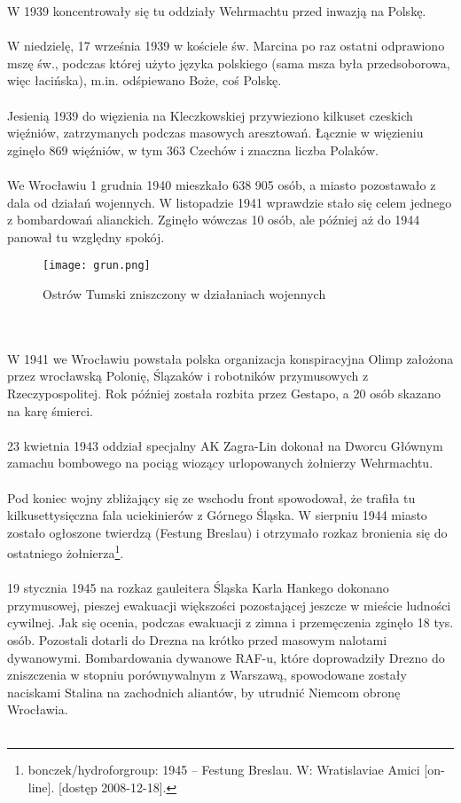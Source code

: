 \documentclass[12pt]{article}
\begin{document}
W 1939 koncentrowały się tu oddziały Wehrmachtu przed inwazją na Polskę.\\\\
W niedzielę, 17 września 1939 w kościele św. Marcina po raz ostatni odprawiono mszę św., podczas której użyto języka polskiego (sama msza była przedsoborowa, więc łacińska), m.in. odśpiewano Boże, coś Polskę.\\\\
Jesienią 1939 do więzienia na Kleczkowskiej przywieziono kilkuset czeskich więźniów, zatrzymanych podczas masowych aresztowań. Łącznie w więzieniu zginęło 869 więźniów, w tym 363 Czechów i znaczna liczba Polaków.\\\\
We Wrocławiu 1 grudnia 1940 mieszkało 638 905 osób, a miasto pozostawało z dala od działań wojennych. W listopadzie 1941 wprawdzie stało się celem jednego z bombardowań alianckich. Zginęło wówczas 10 osób, ale później aż do 1944 panował tu względny spokój.
\begin{figure}[h]
    \centering
    \texttt{[image: grun.png]}
    \caption{Ostrów Tumski zniszczony w działaniach wojennych}
    \label{fig:grun}
\end{figure}\\\\
W 1941 we Wrocławiu powstała polska organizacja konspiracyjna Olimp założona przez wrocławską Polonię, Ślązaków i robotników przymusowych z Rzeczypospolitej. Rok później została rozbita przez Gestapo, a 20 osób skazano na karę śmierci.\\\\
23 kwietnia 1943 oddział specjalny AK Zagra-Lin dokonał na Dworcu Głównym zamachu bombowego na pociąg wiozący urlopowanych żołnierzy Wehrmachtu.\\\\
Pod koniec wojny zbliżający się ze wschodu front spowodował, że trafiła tu kilkusettysięczna fala uciekinierów z Górnego Śląska. W sierpniu 1944 miasto zostało ogłoszone twierdzą (Festung Breslau) i otrzymało rozkaz bronienia się do ostatniego żołnierza\footnote{bonczek/hydroforgroup: 1945 – Festung Breslau. W: Wratislaviae Amici [on-line]. [dostęp 2008-12-18].}.\\\\
19 stycznia 1945 na rozkaz gauleitera Śląska Karla Hankego dokonano przymusowej, pieszej ewakuacji większości pozostającej jeszcze w mieście ludności cywilnej. Jak się ocenia, podczas ewakuacji z zimna i przemęczenia zginęło 18 tys. osób. Pozostali dotarli do Drezna na krótko przed masowym nalotami dywanowymi. Bombardowania dywanowe RAF-u, które doprowadziły Drezno do zniszczenia w stopniu porównywalnym z Warszawą, spowodowane zostały naciskami Stalina na zachodnich aliantów, by utrudnić Niemcom obronę Wrocławia.\\\\
\end{document}
